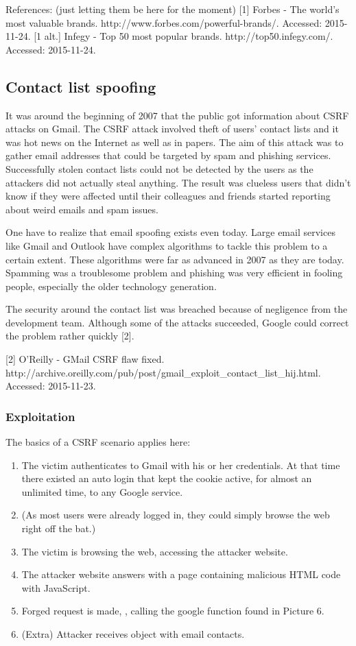 \documentclass[a4paper,11pt,openany]{report}
\begin{document}
References: (just letting them be here for the moment)
[1] Forbes - The world's most valuable brands. http://www.forbes.com/powerful-brands/. Accessed: 2015-11-24.
[1 alt.] Infegy - Top 50 most popular brands. http://top50.infegy.com/. Accessed: 2015-11-24.
  
  \subsection{Contact list spoofing}
  It was around the beginning of 2007 that the public got information about CSRF attacks on Gmail. The CSRF 
  attack involved theft of users' contact lists and it was hot news on the Internet as well as in papers. The 
  aim of this attack was to gather email addresses that could be targeted by spam and phishing services.
  Successfully stolen contact lists could not be detected by the users as the attackers did not actually steal
  anything. The result was clueless users that didn't know if they were affected until their colleagues and 
  friends started reporting about weird emails and spam issues.
  
  One have to realize that email spoofing exists even today. Large email services like Gmail and Outlook have
  complex algorithms to tackle this problem to a certain extent. These algorithms were far as advanced in 2007 as 
  they are today. Spamming was a troublesome problem and phishing was very efficient in fooling people, especially 
  the older technology generation.
  
  The security around the contact list was breached because of negligence from the development team. Although
  some of the attacks succeeded, Google could correct the problem rather quickly [2].
  
[2] O'Reilly - GMail CSRF flaw fixed. http://archive.oreilly.com/pub/post/gmail_exploit_contact_list_hij.html. Accessed: 2015-11-23.

  \subsubsection{Exploitation}
  The basics of a CSRF scenario applies here:
  \begin{enumerate}
   \item The victim authenticates to Gmail with his or her credentials. At that time there existed an auto login
   that kept the cookie active, for almost an unlimited time, to any Google service.
   \item (As most users were already logged in, they could simply browse the web right off the bat.)
   \item The victim is browsing the web, accessing the attacker website. 
   \item The attacker website answers with a page containing malicious HTML code with JavaScript.
   \item Forged request is made, , calling the google function found in Picture 6. %
   \item (Extra) Attacker receives object with email contacts. %
  \end{enumerate}
  
\end{document}
